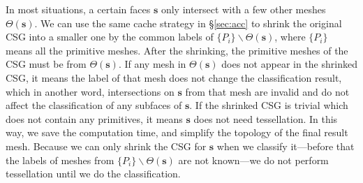 In most situations, a certain faces $\bm{s}$ only intersect with a few other meshes $\Theta(\bm{s})$. We can use the same cache strategy in \S\ref{sec:acc} to shrink the original CSG into a smaller one by the common labels of $\{P_i\}\backslash\Theta(\bm{s})$, where $\{P_i\}$ means all the primitive meshes. After the shrinking, the primitive meshes of the CSG must be from $\Theta(\bm{s})$. If any mesh in $\Theta(\bm{s})$ does not appear in the shrinked CSG, it means the label of that mesh does not change the classification result, which in another word, intersections on $\bm{s}$ from that mesh are invalid and do not affect the classification of any subfaces of $\bm{s}$. If the shrinked CSG is trivial which does not contain any primitives, it means $\bm{s}$ does not need tessellation. In this way, we save the computation time, and simplify the topology of the final result mesh. Because we can only shrink the CSG for $\bm{s}$ when we classify it---before that the labels of meshes from $\{P_i\}\backslash\Theta(\bm{s})$ are not known---we do not perform tessellation until we do the classification.
\fi
